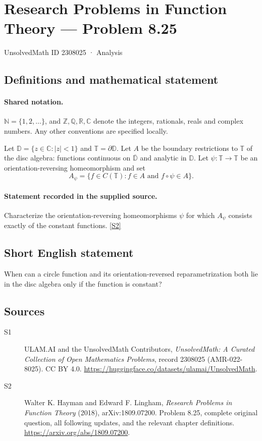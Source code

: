 \documentclass[11pt]{book}
\newcommand{\sref}[2]{\hyperlink{source:#1:#2}{[S#2]}}
\begin{document}
\setcounter{section}{2308024}
\section{Research Problems in Function Theory — Problem 8.25}\label{2308025}
{\small\sffamily UnsolvedMath ID 2308025 · Analysis}
\subsection{Definitions and mathematical statement}

\paragraph{Shared notation.}$\mathbb N=\{1,2,\ldots\}$, and $\mathbb Z,\mathbb Q,\mathbb R,\mathbb C$ denote the integers, rationals, reals and complex numbers. Any other conventions are specified locally.


Let $\mathbb D=\{z\in\mathbb C:|z|<1\}$ and $\mathbb T=\partial\mathbb D$. Let $A$ be the boundary restrictions to $\mathbb T$ of the disc algebra: functions continuous on $\overline{\mathbb D}$ and analytic in $\mathbb D$. Let $\psi:\mathbb T\to\mathbb T$ be an orientation-reversing homeomorphism and set \[A_\psi=\{f\in C(\mathbb T):f\in A\text{ and }f\circ\psi\in A\}.\]
\paragraph{Statement recorded in the supplied source.}
Characterize the orientation-reversing homeomorphisms $\psi$ for which $A_\psi$ consists exactly of the constant functions. \sref{2308025}{2}
\subsection{Short English statement}
When can a circle function and its orientation-reversed reparametrization both lie in the disc algebra only if the function is constant?
\subsection{Sources}
\begin{description}
\item[\hypertarget{source:2308025:1}{S1}] ULAM.AI and the UnsolvedMath Contributors, \emph{UnsolvedMath: A Curated Collection of Open Mathematics Problems}, record 2308025 (AMR-022-8025). CC BY 4.0. \url{https://huggingface.co/datasets/ulamai/UnsolvedMath}.
\item[\hypertarget{source:2308025:2}{S2}] Walter K. Hayman and Edward F. Lingham, \emph{Research Problems in Function Theory} (2018), arXiv:1809.07200. Problem 8.25, complete original question, all following updates, and the relevant chapter definitions. \url{https://arxiv.org/abs/1809.07200}.
\end{description}
\label{end:2308025}
\end{document}
